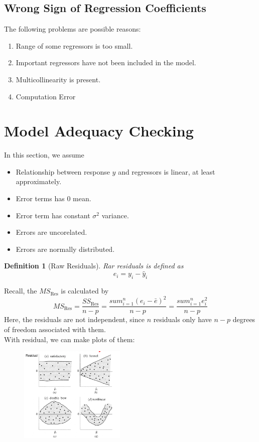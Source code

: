 \documentclass[11pt]{article}
\newtheorem{definition}{Definition}[section]
\theoremstyle{definition}
\begin{document}
\subsection{Wrong Sign of Regression Coefficients}
The following problems are possible reasons:
\begin{enumerate}
  \item Range of some regressors is too small.
  \item Important regressors have not been included in the model.
  \item Multicollinearity is present.
  \item Computation Error
\end{enumerate}
\section{Model Adequacy Checking}
In this section, we assume
\begin{itemize}
  \item Relationship between response $y$ and regressors is linear, at least approximately.
  \item Error terms has $0$ mean.
  \item Error term has constant $\sigma^2$ variance.
  \item Errors are uncorelated.
  \item Errors are normally distributed.
\end{itemize}
\begin{definition}[Raw Residuals]
\normalfont Rar residuals is defined as
\[
e_i=y_i-\hat{y}_i
\]
\end{definition}
Recall, the $MS_\text{Res}$ is calculated by
\[
MS_\text{Res}=\frac{SS_\text{Res}}{n-p}=\frac{sum_{i=1}^n(e_i-\bar{e})^2}{n-p}=\frac{sum_{i=1}^n e_i^2}{n-p}
\]
Here, the residuals are not independent, since $n$ residuals only have $n-p$ degrees of freedom associated with them.\\
With residual, we can make plots of them:
\begin{figure}[h]
\centering
\includegraphics[width=0.45\textwidth]{1.png}
\end{figure}
\end{document}

